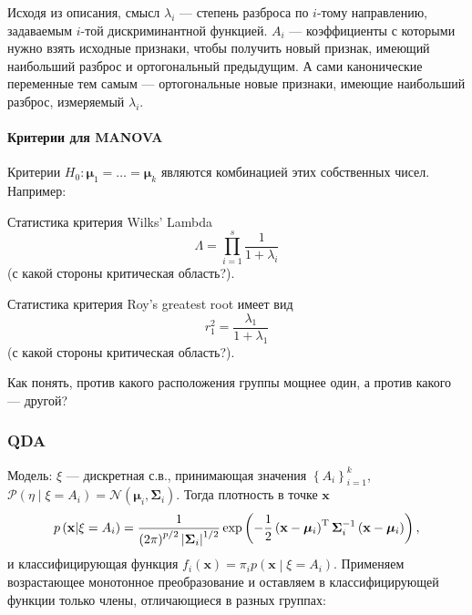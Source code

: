 Исходя из описания, смысл $\lambda_i$ --- степень разброса по $i$-тому направлению, задаваемым $i$-той дискриминантной функцией.
$A_i$ --- коэффициенты с которыми нужно взять исходные признаки, чтобы получить новый признак, имеющий наибольший разброс и ортогональный
предыдущим. А сами канонические переменные тем самым --- ортогональные новые признаки, имеющие наибольший разброс, измеряемый $\lambda_i$.







\paragraph{Критерии для MANOVA}

Критерии $H_0:\bm\mu_1=\ldots=\bm\mu_k$ являются комбинацией этих собственных чисел. Например:

Статистика критерия Wilks' Lambda $$\Lambda = \prod_{i=1}^s {\frac{1}{1 + \lambda_i}}$$ (с какой стороны критическая область?). 

Статистика критерия Roy's greatest root имеет вид $$r_1^2 = \frac{\lambda_1}{1+\lambda_1} $$ (с какой стороны критическая область?).

Как понять, против какого расположения группы мощнее один, а против какого --- другой?


	\subsubsection{QDA} %
	\label{ssub:qda}

	Модель: $\xi$ --- дискретная с.в., принимающая значения $\left\lbrace A_i\right\rbrace_{i=1}^k$, $\mathcal P(\eta\mid \xi = A_i) = \mathcal N\left(\bm{\mu}_i, \bm{\Sigma}_i\right)$. Тогда плотность в точке $\mathbf{x}$
		$$p\left(\mathbf{x}\middle\vert \xi = A_i\right) = \frac{1}{\left(2\pi\right)^{p/2}\left\vert\bm{\Sigma}_i\right\vert^{1/2}} \exp\left(-\frac{1}{2}\left(\mathbf{x} - \bm{\mu}_i\right)^{\mathrm{T}}\bm{\Sigma}_i^{-1}\left(\mathbf{x} - \bm{\mu}_i\right)\right),$$
		и классифицирующая функция $f_i\left(\mathbf{x}\right) = \pi_i p\left(\mathbf{x}\middle\vert \xi = A_i\right)$. Применяем возрастающее монотонное преобразование и оставляем в классифицирующей функции только члены, отличающиеся в разных группах:

